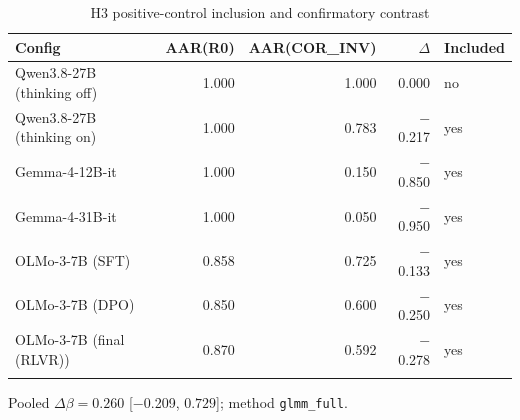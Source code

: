 \begin{table}[t]
\centering
\caption{H3 positive-control inclusion and confirmatory contrast}
\label{tab:h3}
\begin{tabular}{lrrrl}
\toprule
Config & AAR(R0) & AAR(COR\_INV) & $\Delta$ & Included \\
\midrule
Qwen3.8-27B (thinking off) & 1.000 & 1.000 & 0.000 & no \\
Qwen3.8-27B (thinking on) & 1.000 & 0.783 & $-$0.217 & yes \\
Gemma-4-12B-it & 1.000 & 0.150 & $-$0.850 & yes \\
Gemma-4-31B-it & 1.000 & 0.050 & $-$0.950 & yes \\
OLMo-3-7B (SFT) & 0.858 & 0.725 & $-$0.133 & yes \\
OLMo-3-7B (DPO) & 0.850 & 0.600 & $-$0.250 & yes \\
OLMo-3-7B (final (RLVR)) & 0.870 & 0.592 & $-$0.278 & yes \\
\botrule
\end{tabular}
\begin{tablenotes}
\item[a] Pooled $\Delta\beta = 0.260$ [$-$0.209, $0.729$]; method \texttt{glmm\_full}.
\end{tablenotes}
\end{table}
